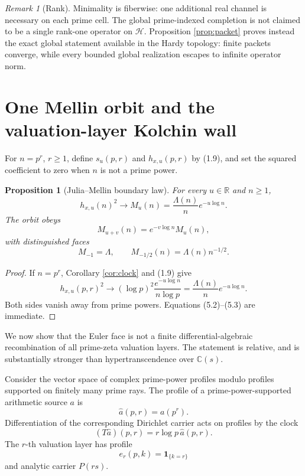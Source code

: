 \documentclass[11pt]{article}
\newtheorem{proposition}[theorem]{Proposition}
\theoremstyle{definition}
\theoremstyle{remark}
\newtheorem{remark}[theorem]{Remark}
\newcommand{\C}{\mathbb C}
\newcommand{\R}{\mathbb R}
\newcommand{\cH}{\mathcal H}
\begin{document}
\begin{remark}[Rank]
Minimality is fiberwise: one additional real channel is necessary on each prime cell.  The
global prime-indexed completion is not claimed to be a single rank-one operator on \(\cH\).
Proposition \ref{prop:packet} proves instead the exact global statement available in the Hardy
topology: finite packets converge, while every bounded global realization escapes to infinite
operator norm.
\end{remark}

\section{One Mellin orbit and the valuation-layer Kolchin wall}\label{sec:kolchin}

For \(n=p^r\), \(r\ge1\), define \(s_u(p,r)\) and \(h_{x,u}(p,r)\) by (1.9), and set the squared
coefficient to zero when \(n\) is not a prime power.

\begin{proposition}[Julia--Mellin boundary law]\label{prop:mellin}
For every \(u\in\R\) and \(n\ge1\),
\[
 h_{x,u}(n)^2\longrightarrow
 M_u(n)=\frac{\Lambda(n)}n e^{-u\log n}.             \tag{5.1}
\]
The orbit obeys
\[
 M_{u+v}(n)=e^{-v\log n}M_u(n),                     \tag{5.2}
\]
with distinguished faces
\[
 M_{-1}=\Lambda,\qquad M_{-1/2}(n)=\Lambda(n)n^{-1/2}. \tag{5.3}
\]
\end{proposition}

\begin{proof}
If \(n=p^r\), Corollary \ref{cor:clock} and (1.9) give
\[
 h_{x,u}(p,r)^2\longrightarrow
 (\log p)^2\frac{e^{-u\log n}}{n\log p}
 =\frac{\Lambda(n)}n e^{-u\log n}.
\]
Both sides vanish away from prime powers.  Equations (5.2)--(5.3) are immediate.
\end{proof}

We now show that the Euler face is not a finite differential-algebraic recombination of all
prime-zeta valuation layers.  The statement is relative, and is substantially stronger than
hypertranscendence over \(\C(s)\).

Consider the vector space of complex prime-power profiles modulo profiles supported on finitely
many prime rays.  The profile of a prime-power-supported arithmetic source \(a\) is
\[
 \widehat a(p,r)=a(p^r).
\]
Differentiation of the corresponding Dirichlet carrier acts on profiles by the clock
\[
 (T\widehat a)(p,r)=r\log p\,\widehat a(p,r).        \tag{5.4}
\]
The \(r\)-th valuation layer has profile
\[
 e_r(p,k)=\mathbf 1_{\{k=r\}}
\]
and analytic carrier \(P(rs)\).
\end{document}
